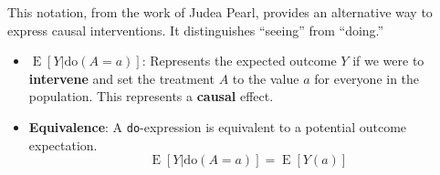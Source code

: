 \documentclass[
  letterpaper,
  DIV=11,
  numbers=noendperiod]{scrartcl}
\providecommand{\tightlist}{%
  \setlength{\itemsep}{0pt}\setlength{\parskip}{0pt}}
\begin{document}
This notation, from the work of Judea Pearl, provides an alternative way
to express causal interventions. It distinguishes ``seeing'' from
``doing.''

\begin{itemize}
\tightlist
\item
  \textbf{\(\operatorname{E}[Y|\text{do}(A=a)]\)}: Represents the
  expected outcome \(Y\) if we were to \textbf{intervene} and set the
  treatment \(A\) to the value \(a\) for everyone in the population.
  This represents a \textbf{causal} effect.
\item
  \textbf{Equivalence}: A \texttt{do}-expression is equivalent to a
  potential outcome expectation.
  \[\operatorname{E}[Y|\text{do}(A=a)] = \operatorname{E}[Y(a)]\]
\end{itemize}
\end{document}
